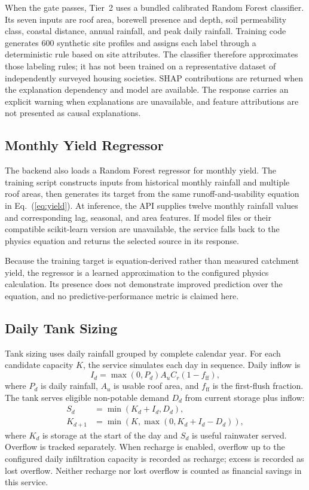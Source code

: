 \documentclass[conference]{IEEEtran}
\begin{document}
When the gate passes, Tier~2 uses a bundled calibrated Random Forest
classifier. Its seven inputs are roof area, borewell presence and depth,
soil permeability class, coastal distance, annual rainfall, and peak
daily rainfall. Training code generates 600 synthetic site profiles and
assigns each label through a deterministic rule based on site
attributes. The classifier therefore approximates those labeling rules;
it has not been trained on a representative dataset of independently
surveyed housing societies. SHAP contributions are returned when the
explanation dependency and model are available. The response carries an
explicit warning when explanations are unavailable, and feature
attributions are not presented as causal explanations.

\subsection{Monthly Yield Regressor}
\label{sec:yield-model}

The backend also loads a Random Forest regressor for monthly yield. The
training script constructs inputs from historical monthly rainfall and
multiple roof areas, then generates its target from the same
runoff-and-usability equation in Eq.~(\ref{eq:yield}). At inference, the
API supplies twelve monthly rainfall values and corresponding lag,
seasonal, and area features. If model files or their compatible
scikit-learn version are unavailable, the service falls back to the
physics equation and returns the selected source in its response.

Because the training target is equation-derived rather than measured
catchment yield, the regressor is a learned approximation to the
configured physics calculation. Its presence does not demonstrate
improved prediction over the equation, and no predictive-performance
metric is claimed here.

\subsection{Daily Tank Sizing}
\label{sec:tank}

Tank sizing uses daily rainfall grouped by complete calendar year. For
each candidate capacity $K$, the service simulates each day in sequence.
Daily inflow is
\begin{equation}
  I_d = \max(0,P_d) A_u C_r (1-f_{\mathrm{ff}}),
  \label{eq:inflow}
\end{equation}
where $P_d$ is daily rainfall, $A_u$ is usable roof area, and
$f_{\mathrm{ff}}$ is the first-flush fraction. The tank serves eligible
non-potable demand $D_d$ from current storage plus inflow:
\begin{align}
  S_d &= \min(K_d + I_d,D_d),\\
  K_{d+1} &= \min\!\left(K,\max(0,K_d+I_d-D_d)\right),
\end{align}
where $K_d$ is storage at the start of the day and $S_d$ is useful
rainwater served. Overflow is tracked separately. When recharge is
enabled, overflow up to the configured daily infiltration capacity is
recorded as recharge; excess is recorded as lost overflow. Neither
recharge nor lost overflow is counted as financial savings in this
service.
\end{document}
